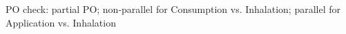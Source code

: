 PO check: partial PO; non-parallel for Consumption vs. Inhalation; parallel for Application vs. Inhalation%
